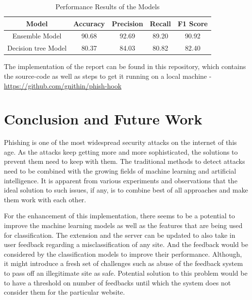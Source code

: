 \documentclass[conference]{IEEEtran}
\begin{document}
\begin{table}[htbp]
    \caption{Performance Results of the Models}
    \begin{center}
    \begin{tabular}{|c|c|c|c|c|}
    \hline
    \textbf{Model} & \textbf{Accuracy}& \textbf{Precision}& \textbf{Recall}& \textbf{F1 Score} \\
    \hline
    Ensemble Model\cite{GregaDataset}& 90.68& 92.69 & 89.20 & 90.92\\
    \hline
    Decision tree Model\cite{UCIDataset}& 80.37& 84.03 & 80.82 & 82.40 \\
    \hline
    \end{tabular}
    \label{tab1}
    \end{center}
    \end{table}
    

\par The implementation of the report can be found in this repository, which contains the source-code as well as steps to get it running on a local machine - \href{https://github.com/gnithin/phish-hook}{https://github.com/gnithin/phish-hook}

\section{Conclusion and Future Work}
\par Phishing is one of the most widespread security attacks on the internet of this age.
As the attacks keep getting more and more sophisticated, the solutions to prevent them need to keep with them.
The traditional methods to detect attacks need to be combined with the growing fields of machine learning and artificial intelligence.
It is apparent from various experiments and observations that the ideal solution to such issues, if any, is to combine best of all approaches and make them work with each other.

\par For the enhancement of this implementation, there seems to be a potential to improve the machine learning models as well as the features that are being used for classification.
The extension and the server can be updated to also take in user feedback regarding a misclassification of any site.
And the feedback would be considered by the classification models to improve their performance.
Although, it might introduce a fresh set of challenges such as abuse of the feedback system to pass off an illegitimate site as safe.
Potential solution to this problem would be to have a threshold on number of feedbacks until which the system does not consider them for the particular website.
\end{document}
